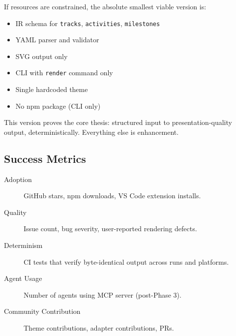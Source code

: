 If resources are constrained, the absolute smallest viable version is:

\begin{itemize}
  \item IR schema for \texttt{tracks}, \texttt{activities}, \texttt{milestones}
  \item YAML parser and validator
  \item SVG output only
  \item CLI with \texttt{render} command only
  \item Single hardcoded theme
  \item No npm package (CLI only)
\end{itemize}

This version proves the core thesis: structured input to presentation-quality output, deterministically. Everything else is enhancement.

\subsection{Success Metrics}

\begin{description}
  \item[Adoption] GitHub stars, npm downloads, VS Code extension installs.
  
  \item[Quality] Issue count, bug severity, user-reported rendering defects.
  
  \item[Determinism] CI tests that verify byte-identical output across runs and platforms.
  
  \item[Agent Usage] Number of agents using MCP server (post-Phase 3).
  
  \item[Community Contribution] Theme contributions, adapter contributions, PRs.
\end{description}
